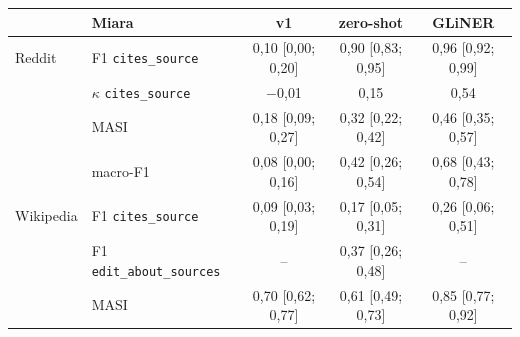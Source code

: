 \begin{tabular}{llccc}
\toprule
 & Miara & v1 & zero-shot & GLiNER \\
\midrule
Reddit & F1 \texttt{cites\_source} & 0{,}10 {\scriptsize [0{,}00; 0{,}20]} & 0{,}90 {\scriptsize [0{,}83; 0{,}95]} & 0{,}96 {\scriptsize [0{,}92; 0{,}99]} \\
 & $\kappa$ \texttt{cites\_source} & $-$0{,}01 & 0{,}15 & 0{,}54 \\
 & MASI & 0{,}18 {\scriptsize [0{,}09; 0{,}27]} & 0{,}32 {\scriptsize [0{,}22; 0{,}42]} & 0{,}46 {\scriptsize [0{,}35; 0{,}57]} \\
 & macro-F1 & 0{,}08 {\scriptsize [0{,}00; 0{,}16]} & 0{,}42 {\scriptsize [0{,}26; 0{,}54]} & 0{,}68 {\scriptsize [0{,}43; 0{,}78]} \\
\midrule
Wikipedia & F1 \texttt{cites\_source} & 0{,}09 {\scriptsize [0{,}03; 0{,}19]} & 0{,}17 {\scriptsize [0{,}05; 0{,}31]} & 0{,}26 {\scriptsize [0{,}06; 0{,}51]} \\
 & F1 \texttt{edit\_about\_sources} & -- & 0{,}37 {\scriptsize [0{,}26; 0{,}48]} & -- \\
 & MASI & 0{,}70 {\scriptsize [0{,}62; 0{,}77]} & 0{,}61 {\scriptsize [0{,}49; 0{,}73]} & 0{,}85 {\scriptsize [0{,}77; 0{,}92]} \\
\bottomrule
\end{tabular}
